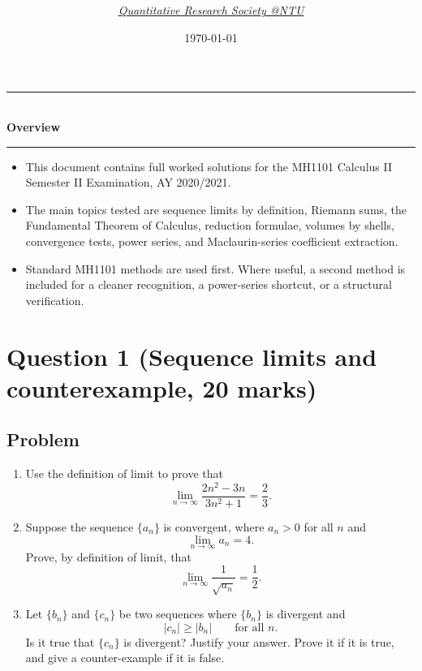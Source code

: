 \documentclass[12pt]{article}
\title{
\Huge \CourseCode\ \CourseName \\[0.3em]
\Large \DocType  \\[0.3em]
\large \ExamMeta
}
\author{
  \textit{\href{https://qrsntu.org}{Quantitative Research Society @NTU}}
}
\date{\today}
\newenvironment{overview}{
  \par\bigskip
  \begin{center}
    \rule{0.92\linewidth}{0.6pt}\\[-0.2em]
    \textbf{Overview}\\[-0.2em]
    \rule{0.92\linewidth}{0.6pt}
  \end{center}
  \vspace{-0.3em}
  \begin{itemize}[leftmargin=1.6em, itemsep=0.2em, topsep=0.2em]
}{
  \end{itemize}
  \par\bigskip
}
\begin{document}
\maketitle
\thispagestyle{plainfirst}
\pagestyle{main}

\begin{overview}
  \item This document contains full worked solutions for the MH1101 Calculus II Semester II Examination, AY 2020/2021.
  \item The main topics tested are sequence limits by definition, Riemann sums, the Fundamental Theorem of Calculus, reduction formulae, volumes by shells, convergence tests, power series, and Maclaurin-series coefficient extraction.
  \item Standard MH1101 methods are used first. Where useful, a second method is included for a cleaner recognition, a power-series shortcut, or a structural verification.
\end{overview}

\newpage
\tableofcontents

\newpage
\section{Question 1 (Sequence limits and counterexample, 20 marks)}

\subsection{Problem}

\begin{enumerate}[label=(\alph*)]
\item Use the definition of limit to prove that
\[
\lim_{n\to\infty}\frac{2n^2-3n}{3n^2+1}=\frac23.
\]

\item Suppose the sequence $\{a_n\}$ is convergent, where $a_n>0$ for all $n$ and
\[
\lim_{n\to\infty}a_n=4.
\]
Prove, by definition of limit, that
\[
\lim_{n\to\infty}\frac1{\sqrt{a_n}}=\frac12.
\]

\item Let $\{b_n\}$ and $\{c_n\}$ be two sequences where $\{b_n\}$ is divergent and
\[
|c_n|\ge |b_n|
\qquad\text{for all }n.
\]
Is it true that $\{c_n\}$ is divergent? Justify your answer. Prove it if it is true, and give a counter-example if it is false.
\end{enumerate}
\end{document}
